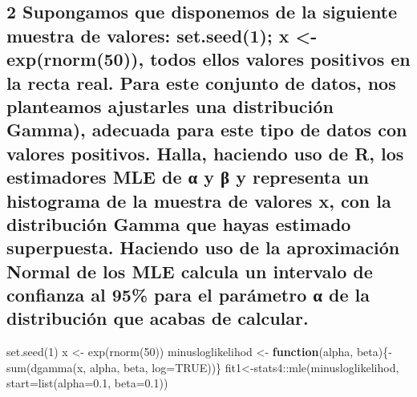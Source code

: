 \documentclass[
]{article}
\newenvironment{Shaded}{\begin{snugshade}}{\end{snugshade}}
\newcommand{\AttributeTok}[1]{\textcolor[rgb]{0.77,0.63,0.00}{#1}}
\newcommand{\ConstantTok}[1]{\textcolor[rgb]{0.00,0.00,0.00}{#1}}
\newcommand{\ControlFlowTok}[1]{\textcolor[rgb]{0.13,0.29,0.53}{\textbf{#1}}}
\newcommand{\DecValTok}[1]{\textcolor[rgb]{0.00,0.00,0.81}{#1}}
\newcommand{\FloatTok}[1]{\textcolor[rgb]{0.00,0.00,0.81}{#1}}
\newcommand{\FunctionTok}[1]{\textcolor[rgb]{0.00,0.00,0.00}{#1}}
\newcommand{\NormalTok}[1]{#1}
\newcommand{\OtherTok}[1]{\textcolor[rgb]{0.56,0.35,0.01}{#1}}
\newcommand{\SpecialCharTok}[1]{\textcolor[rgb]{0.00,0.00,0.00}{#1}}
\begin{document}
\hypertarget{supongamos-que-disponemos-de-la-siguiente-muestra-de-valores-set.seed1-x---exprnorm50-todos-ellos-valores-positivos-en-la-recta-real.-para-este-conjunto-de-datos-nos-planteamos-ajustarles-una-distribuciuxf3n-gamma-adecuada-para-este-tipo-de-datos-con-valores-positivos.-halla-haciendo-uso-de-r-los-estimadores-mle-de-ux3b1-y-ux3b2-y-representa-un-histograma-de-la-muestra-de-valores-x-con-la-distribuciuxf3n-gamma-que-hayas-estimado-superpuesta.-haciendo-uso-de-la-aproximaciuxf3n-normal-de-los-mle-calcula-un-intervalo-de-confianza-al-95-para-el-paruxe1metro-ux3b1-de-la-distribuciuxf3n-que-acabas-de-calcular.}{%
\subsection{2 Supongamos que disponemos de la siguiente muestra de
valores: set.seed(1); x \textless- exp(rnorm(50)), todos ellos valores
positivos en la recta real. Para este conjunto de datos, nos planteamos
ajustarles una distribución Gamma), adecuada para este tipo de datos con
valores positivos. Halla, haciendo uso de R, los estimadores MLE de α y
β y representa un histograma de la muestra de valores x, con la
distribución Gamma que hayas estimado superpuesta. Haciendo uso de la
aproximación Normal de los MLE calcula un intervalo de confianza al 95\%
para el parámetro α de la distribución que acabas de
calcular.}\label{supongamos-que-disponemos-de-la-siguiente-muestra-de-valores-set.seed1-x---exprnorm50-todos-ellos-valores-positivos-en-la-recta-real.-para-este-conjunto-de-datos-nos-planteamos-ajustarles-una-distribuciuxf3n-gamma-adecuada-para-este-tipo-de-datos-con-valores-positivos.-halla-haciendo-uso-de-r-los-estimadores-mle-de-ux3b1-y-ux3b2-y-representa-un-histograma-de-la-muestra-de-valores-x-con-la-distribuciuxf3n-gamma-que-hayas-estimado-superpuesta.-haciendo-uso-de-la-aproximaciuxf3n-normal-de-los-mle-calcula-un-intervalo-de-confianza-al-95-para-el-paruxe1metro-ux3b1-de-la-distribuciuxf3n-que-acabas-de-calcular.}}

\begin{Shaded}
\begin{Highlighting}[]
\FunctionTok{set.seed}\NormalTok{(}\DecValTok{1}\NormalTok{)}
\NormalTok{x }\OtherTok{\textless{}{-}} \FunctionTok{exp}\NormalTok{(}\FunctionTok{rnorm}\NormalTok{(}\DecValTok{50}\NormalTok{))}
\NormalTok{minusloglikelihod }\OtherTok{\textless{}{-}} \ControlFlowTok{function}\NormalTok{(alpha, beta)\{}\SpecialCharTok{{-}}\FunctionTok{sum}\NormalTok{(}\FunctionTok{dgamma}\NormalTok{(x, alpha, beta, }\AttributeTok{log=}\ConstantTok{TRUE}\NormalTok{))\}}
\NormalTok{fit1}\OtherTok{\textless{}{-}}\NormalTok{stats4}\SpecialCharTok{::}\FunctionTok{mle}\NormalTok{(minusloglikelihod, }\AttributeTok{start=}\FunctionTok{list}\NormalTok{(}\AttributeTok{alpha=}\FloatTok{0.1}\NormalTok{, }\AttributeTok{beta=}\FloatTok{0.1}\NormalTok{))}
\end{Highlighting}
\end{Shaded}
\end{document}
